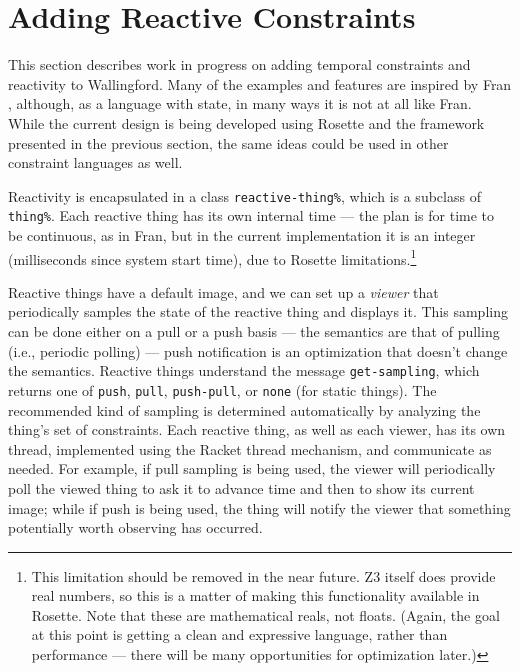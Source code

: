 \documentclass[reprint]{sigplanconf}
\begin{document}

\section{Adding Reactive Constraints}
\label{sec:reactive}

This section describes work in progress on adding temporal constraints and
reactivity to Wallingford.  Many of the examples and features are inspired
by Fran \cite{elliot-icfp-1997}, although, as a language with state, in
many ways it is not at all like Fran.  While the current design is being
developed using Rosette and the framework presented in the previous
section, the same ideas could be used in other constraint languages as
well.

Reactivity is encapsulated in a class \verb|reactive-thing%|, which is
a subclass of \verb|thing%|.  Each reactive thing has its own internal
time --- the plan is for time to be continuous, as in Fran, but in the
current implementation it is an integer (milliseconds since system
start time), due to Rosette limitations.\footnote{This limitation
  should be removed in the near future.  Z3 itself does provide real
  numbers, so this is a matter of making this functionality available
  in Rosette.  Note that these are mathematical reals, not floats.
  (Again, the goal at this point is getting a clean and expressive
  language, rather than performance --- there will be many
  opportunities for optimization later.)}

Reactive things have a default image, and we can set up a
\emph{viewer} that periodically samples the state of the reactive
thing and displays it.  This sampling can be done either on a pull or
a push basis --- the semantics are that of pulling (i.e., periodic
polling) --- push notification is an optimization that doesn't change
the semantics.  Reactive things understand the message
\verb|get-sampling|, which returns one of \verb|push|, \verb|pull|,
\verb|push-pull|, or \verb|none| (for static things).  The recommended
kind of sampling is determined automatically by analyzing the thing's
set of constraints.  Each reactive thing, as well as each viewer, has
its own thread, implemented using the Racket thread mechanism, and
communicate as needed.  For example, if pull sampling is being used,
the viewer will periodically poll the viewed thing to ask it to
advance time and then to show its current image; while if push is
being used, the thing will notify the viewer that something
potentially worth observing has occurred.
\end{document}
